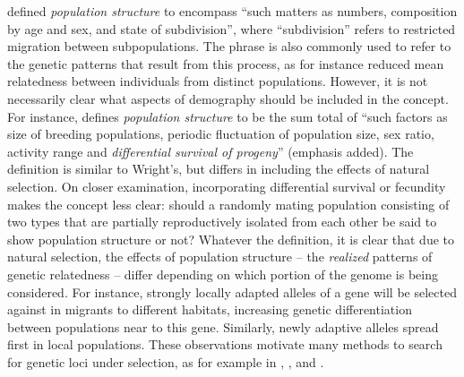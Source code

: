 \documentclass[11pt, oneside]{article}   	%
\newif\ifsubmission
\newcommand\citet{\cite}
\newcommand{\citetx}[2][]{\ifsubmission#1 \cite{#2}\else\citet{#2}\fi}
\begin{document}
\citetx[Wright]{wright1949genetical} defined \emph{population structure} to encompass ``such matters as numbers, composition by age and sex, and state of subdivision'',
where ``subdivision'' refers to restricted migration between subpopulations.
The phrase is also commonly used to refer to the genetic patterns that result from this process,
as for instance reduced mean relatedness between individuals from distinct populations.
However, it is not necessarily clear what aspects of demography should be included in the concept.
For instance, 
\citetx[Blair]{blair1943population} defines \emph{population structure} to be the sum total of
``such factors as size of breeding populations, periodic fluctuation of population size, sex ratio, activity range and \emph{differential survival of progeny}'' (emphasis added).
The definition is similar to Wright's, but differs in including the effects of natural selection.
On closer examination, incorporating differential survival or fecundity makes the concept less clear:
should a randomly mating population consisting of two types that are partially reproductively isolated from each other
be said to show population structure or not?
Whatever the definition,
it is clear that due to natural selection, the effects of population structure --
the \emph{realized} patterns of genetic relatedness --
differ depending on which portion of the genome is being considered.
For instance, strongly locally adapted alleles of a gene will be selected against in migrants to different habitats,
increasing genetic differentiation between populations near to this gene.
Similarly, newly adaptive alleles spread first in local populations.
These observations motivate many methods to search for genetic loci under selection,
as for example in \citet{huertasnchez2013genetic}, \citet{martin2016natural}, 
and \citet{duforetfrebourg2015detecting}.


\end{document}
